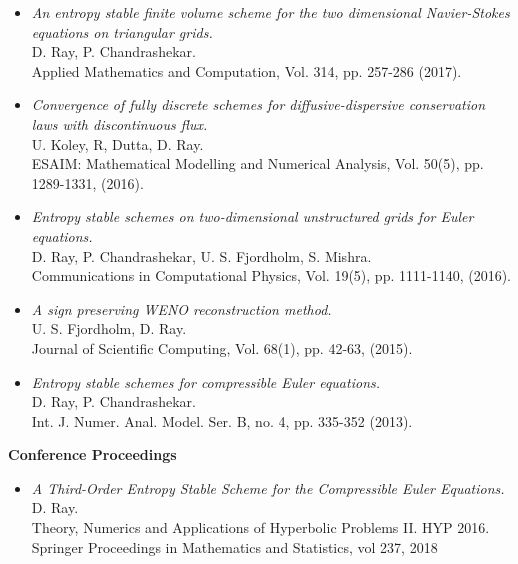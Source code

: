 \documentclass[margin]{res}
\begin{document}
\begin{resume}
\begin{itemize}
            \item {\it An entropy stable finite volume scheme for the two dimensional Navier-Stokes equations on triangular grids.}\\
            D. Ray, P. Chandrashekar.\\
             Applied Mathematics and Computation, Vol. 314, pp. 257-286 (2017).

             \item {\it Convergence of fully discrete schemes for diffusive-dispersive conservation laws with discontinuous flux.}\\
              U. Koley, R, Dutta, D. Ray. \\
              ESAIM: Mathematical Modelling and Numerical Analysis, Vol. 50(5), pp. 1289-1331, (2016).
              
              \item {\it Entropy stable schemes on two-dimensional unstructured grids for Euler equations.}\\
              D. Ray, P. Chandrashekar, U. S. Fjordholm, S. Mishra. \\
              Communications in Computational Physics, Vol. 19(5), pp. 1111-1140, (2016).
            
              \item {\it A sign preserving WENO reconstruction method.}\\
              U. S. Fjordholm, D. Ray. \\
              Journal of Scientific Computing, Vol. 68(1), pp. 42-63, (2015).
             
              \item {\it Entropy stable schemes for compressible Euler equations.}\\
              D. Ray, P. Chandrashekar.\\
              Int. J. Numer. Anal. Model. Ser. B, no. 4, pp. 335-352 (2013).
             \end{itemize}



\textbf{Conference Proceedings}                
            \begin{itemize}           
              \item {\it A Third-Order Entropy Stable Scheme for the Compressible Euler Equations.}\\
              D. Ray.\\
              Theory, Numerics and Applications of Hyperbolic Problems II. HYP 2016. Springer Proceedings in Mathematics and Statistics, vol 237, 2018


\end{itemize}
\end{resume}
\end{document}
